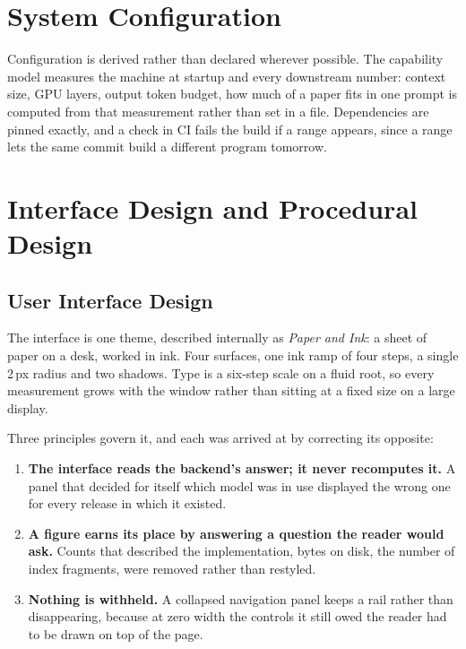 \documentclass[12pt,a4paper]{report}
\begin{document}
\section{System Configuration}

Configuration is derived rather than declared wherever possible. The capability
model measures the machine at startup and every downstream number: context
size, GPU layers, output token budget, how much of a paper fits in one prompt
is computed from that measurement rather than set in a file. Dependencies
are pinned exactly, and a check in CI fails the build if a range appears, since
a range lets the same commit build a different program tomorrow.

\section{Interface Design and Procedural Design}

\subsection{User Interface Design}

The interface is one theme, described internally as \emph{Paper and Ink}: a
sheet of paper on a desk, worked in ink. Four surfaces, one ink ramp of four
steps, a single 2\,px radius and two shadows. Type is a six-step scale on a
fluid root, so every measurement grows with the window rather than sitting at a
fixed size on a large display.

Three principles govern it, and each was arrived at by correcting its opposite:

\begin{enumerate}[leftmargin=*]
  \item \textbf{The interface reads the backend's answer; it never recomputes
        it.} A panel that decided for itself which model was in use displayed
        the wrong one for every release in which it existed.
  \item \textbf{A figure earns its place by answering a question the reader
        would ask.} Counts that described the implementation, bytes on disk,
        the number of index fragments, were removed rather than restyled.
  \item \textbf{Nothing is withheld.} A collapsed navigation panel keeps a rail
        rather than disappearing, because at zero width the controls it still
        owed the reader had to be drawn on top of the page.
\end{enumerate}
\end{document}
